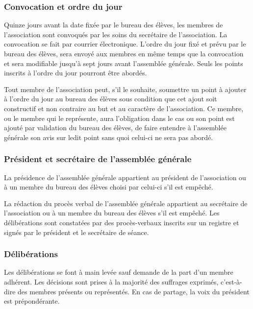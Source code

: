 \documentclass{article}
\begin{document}
			\subsubsection{Convocation et ordre du jour}
\label{ssub:convocation_et_ordre_du_jour}
				Quinze jours avant la date fixée par le bureau des élèves, les
				membres de l’association sont convoqués par les soins du
				secrétaire de l’association. La convocation se fait par courrier
				électronique. L’ordre du jour fixé et prévu par le bureau des
				élèves, sera envoyé aux membres en même temps que la convocation
				et sera modifiable jusqu’à sept jours avant l'assemblée
				générale. Seuls les points inscrits à l’ordre du jour pourront
				être abordés.
				
				Tout membre de l'association peut, s'il le souhaite, soumettre
				un point à ajouter à l'ordre du jour au bureau des élèves sous
				condition que cet ajout soit constructif et non contraire au but
				et au caractère de l'association. Ce membre, ou le membre qui le
				représente, aura l'obligation dans le cas ou son point est
				ajouté par validation du bureau des élèves, de faire entendre à
				l'assemblée générale son avis sur ledit point sans quoi celui-ci
				ne sera pas abordé.

			\subsubsection{Président et secrétaire de l’assemblée générale}
				La présidence de l’assemblée générale appartient au président de
				l’association ou à un membre du bureau des élèves choisi par
				celui-ci s'il est empêché.

				La rédaction du procès verbal de l’assemblée générale appartient
				au secrétaire de l’association ou à un membre du bureau des
				élèves s’il est empêché. Les délibérations sont constatées par
				des procès-verbaux inscrits sur un registre et signés par le
				président et le secrétaire de séance.

			\subsubsection{Délibérations}
				Les délibérations se font à main levée sauf demande de la part
				d’un membre adhérent. Les décisions sont prises à la majorité
				des suffrages exprimés, c’est-à-dire des membres présents ou
				représentés. En cas de partage, la voix du président est
				prépondérante.
\end{document}

